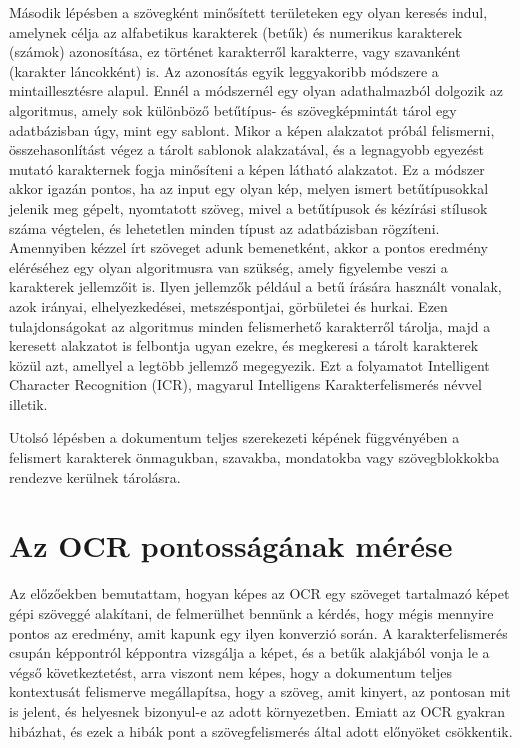 \documentclass[12pt]{report}
\begin{document}
Második lépésben a szövegként minősített területeken egy olyan keresés indul, amelynek célja az alfabetikus karakterek (betűk) és numerikus karakterek (számok) azonosítása, ez történet karakterről karakterre, vagy szavanként (karakter láncokként) is. Az azonosítás egyik leggyakoribb módszere a mintaillesztésre alapul. Ennél a módszernél egy olyan adathalmazból dolgozik az algoritmus, amely sok különböző betűtípus- és szövegképmintát tárol egy adatbázisban úgy, mint egy sablont. Mikor a képen alakzatot próbál felismerni, összehasonlítást végez a tárolt sablonok alakzatával, és a legnagyobb egyezést mutató karakternek fogja minősíteni a képen látható alakzatot. Ez a módszer akkor igazán pontos, ha az input egy olyan kép, melyen ismert betűtípusokkal jelenik meg gépelt, nyomtatott szöveg, mivel a betűtípusok és kézírási stílusok száma végtelen, és lehetetlen minden típust az adatbázisban rögzíteni. Amennyiben kézzel írt szöveget adunk bemenetként, akkor a pontos eredmény eléréséhez egy olyan algoritmusra van szükség, amely figyelembe veszi a karakterek jellemzőit is. Ilyen jellemzők például a betű írására használt vonalak, azok irányai, elhelyezkedései, metszéspontjai, görbületei és hurkai. Ezen tulajdonságokat az algoritmus minden felismerhető karakterről tárolja, majd a keresett alakzatot is felbontja ugyan ezekre, és megkeresi a tárolt karakterek közül azt, amellyel a legtöbb jellemző megegyezik. Ezt a folyamatot Intelligent Character Recognition (ICR), magyarul Intelligens Karakterfelismerés névvel illetik.

Utolsó lépésben a dokumentum teljes szerekezeti képének függvényében a felismert karakterek önmagukban, szavakba, mondatokba vagy szövegblokkokba rendezve kerülnek tárolásra.

\section{Az OCR pontosságának mérése}

Az előzőekben bemutattam, hogyan képes az OCR egy szöveget tartalmazó képet gépi szöveggé alakítani, de felmerülhet bennünk a kérdés, hogy mégis mennyire pontos az eredmény, amit kapunk egy ilyen konverzió során. A karakterfelismerés csupán képpontról képpontra vizsgálja a képet, és a betűk alakjából vonja le a végső következtetést, arra viszont nem képes, hogy a dokumentum teljes kontextusát felismerve megállapítsa, hogy a szöveg, amit kinyert, az pontosan mit is jelent, és helyesnek bizonyul-e az adott környezetben. Emiatt az OCR gyakran hibázhat, és ezek a hibák pont a szövegfelismerés által adott előnyöket csökkentik.
\end{document}
